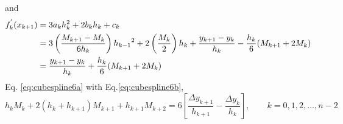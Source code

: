 \documentclass[12pt,class=book,crop=false]{standalone}
\begin{document}
and
\begin{align}
	f_k^{'} (x_{k+1}) & =3a_k h_k^2+2b_k h_k+c_k\notag                                                                                                                 \\
	                  & =3\left(\frac{M_{k+1}-M_k}{6h_k}\right){h_{k-1}}^2+2\left(\frac{M_k}{2}\right) h_k+\frac{y_{k+1}-y_k}{h_k} -\frac{h_k}{6}(M_{k+1}+2M_k )\notag \\
	                  & =\frac{y_{k+1}-y_k}{h_k} +\frac{h_k}{6}(M_{k+1}+2M_k)\label{eq:cubespline6b}
\end{align}
Eq. \eqref{eq:cubespline6a} with Eq.\eqref{eq:cubespline6b},
\begin{equation}
	\label{eq:cubespline7}
	h_k M_k+2(h_k+h_{k+1})M_{k+1}+h_{k+1} M_{k+2}=6\left[\frac{\Delta y_{k+1}}{h_{k+1}} -\frac{\Delta y_k}{h_k} \right],\qquad k = 0, 1, 2,\dots, n-2
\end{equation}
\end{document}
